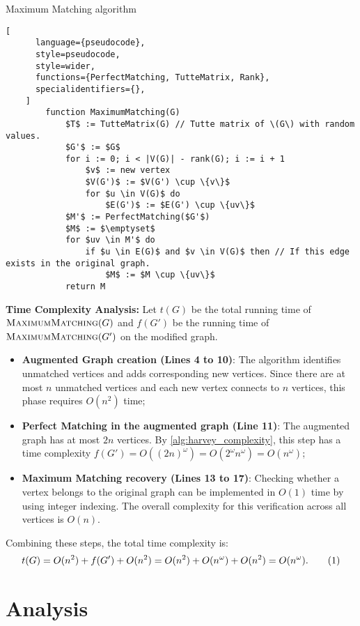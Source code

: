\begin{programruledcaption}{Maximum Matching algorithm}
    \begin{lstlisting}[
      language={pseudocode},
      style=pseudocode,
      style=wider,
      functions={PerfectMatching, TutteMatrix, Rank},
      specialidentifiers={},
    ]
        function MaximumMatching(G)
            $T$ := TutteMatrix(G) // Tutte matrix of \(G\) with random values.
            $G'$ := $G$
            for i := 0; i < |V(G)| - rank(G); i := i + 1 
                $v$ := new vertex
                $V(G')$ := $V(G') \cup \{v\}$
                for $u \in V(G)$ do 
                    $E(G')$ := $E(G') \cup \{uv\}$
            $M'$ := PerfectMatching($G'$)
            $M$ := $\emptyset$
            for $uv \in M'$ do 
                if $u \in E(G)$ and $v \in V(G)$ then // If this edge exists in the original graph.
                    $M$ := $M \cup \{uv\}$
            return M
    \end{lstlisting}
\end{programruledcaption}
\noindent
\textbf{Time Complexity Analysis:} Let \(t(G)\) be the total running time of \(\textsc{MaximumMatching}(G)\) and \(f(G')\) be the running time of \(\textsc{MaximumMatching}(G')\) on the modified graph.
\begin{itemize}
\item \textbf{Augmented Graph creation (Lines 4 to 10)}:
The algorithm identifies unmatched vertices and adds corresponding new vertices. 
Since there are at most \(n\) unmatched vertices and each new vertex connects to \(n\) vertices, this phase requires \(O(n^2)\) time;

\item \textbf{Perfect Matching in the augmented graph (Line 11)}: 
The augmented graph has at most \(2n\) vertices. 
By \cref{alg:harvey_complexity}, this step has a time complexity  \(f(G') = O((2n)^\omega) = O(2^\omega n^\omega) = O(n^\omega)\);

\item \textbf{Maximum Matching recovery (Lines 13 to 17)}: 
Checking whether a vertex belongs to the original graph can be implemented in \(O(1)\) time by using integer indexing. 
The overall complexity for this verification across all vertices is \(O(n)\).
\end{itemize}
Combining these steps, the total time complexity is:
\[
t(G) = O(n^2) + f(G') + O(n^2) = O(n^2) + O(n^\omega) + O(n^2) = O(n^\omega). \numberthis \label{alg:maximum_matching_complexity}
\]

\section{Analysis}